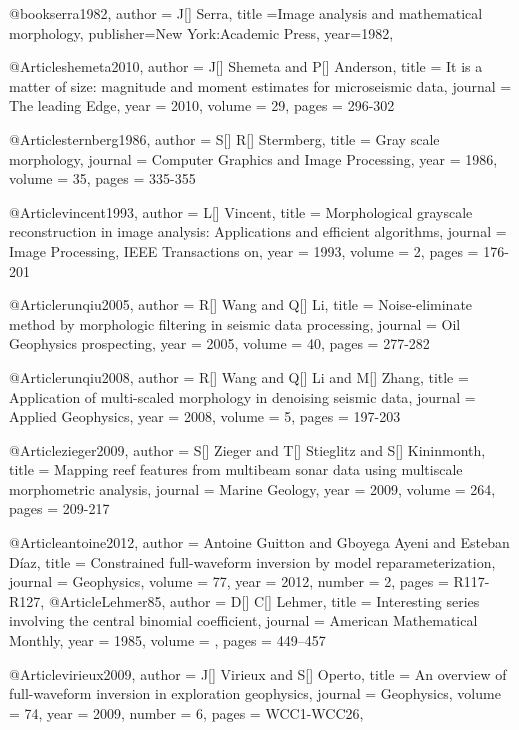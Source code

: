   
@book{serra1982,
  author = {J[] Serra},
  title ={Image analysis and mathematical morphology},
  publisher={New York:Academic Press},
  year=1982,
}

       @Article{shemeta2010,
  author = 	 {J[] Shemeta and P[] Anderson},
  title = 	 {It is a matter of size: magnitude and moment estimates for microseismic data},
  journal = 	 {The leading Edge},
  year = 	 2010,
  volume = 	 29,
  pages = 	 {296-302}} 
  
         @Article{sternberg1986,
  author = 	 {S[] R[] Stermberg},
  title = 	 {Gray scale morphology},
  journal = 	 {Computer Graphics and Image Processing},
  year = 	 1986,
  volume = 	 35,
  pages = 	 {335-355}}  
  
          @Article{vincent1993,
  author = 	 {L[] Vincent},
  title = 	 {Morphological grayscale reconstruction in image analysis: Applications and efficient algorithms},
  journal = 	 {Image Processing, IEEE Transactions on},
  year = 	 1993,
  volume = 	 2,
  pages = 	 {176-201}}  
  
          @Article{runqiu2005,
  author = 	 {R[] Wang and Q[] Li},
  title = 	 {Noise-eliminate method by morphologic filtering in seismic data processing},
  journal = 	 {Oil Geophysics prospecting},
  year = 	 2005,
  volume = 	 40,
  pages = 	 {277-282}}  
  
  
            @Article{runqiu2008,
  author = 	 {R[] Wang and Q[] Li and M[] Zhang},
  title = 	 {Application of multi-scaled morphology in denoising seismic data},
  journal = 	 {Applied Geophysics},
  year = 	 2008,
  volume = 	 5,
  pages = 	 {197-203}}    
 
             @Article{zieger2009,
  author = 	 {S[] Zieger and T[] Stieglitz and S[] Kininmonth},
  title = 	 {Mapping reef features from multibeam sonar data using multiscale morphometric analysis},
  journal = 	 {Marine Geology},
  year = 	 2009,
  volume = 	 264,
  pages = 	 {209-217}}   
  
@Article{antoine2012,
  author =	 { Antoine Guitton and Gboyega Ayeni and Esteban Díaz},
  title =	 {Constrained full-waveform inversion by model reparameterization},
  journal =	 {Geophysics},
  volume =	 77,
  year =	 2012,
  number =	 2,
  pages =	 {R117-R127},
}
@Article{Lehmer85,
  author = 	 {D[] C[] Lehmer},
  title = 	 {Interesting series involving the central binomial coefficient},
  journal = 	 {American Mathematical Monthly},
  year = 	 1985,
  volume =	 ,
  pages =	 {449–457}
}

@Article{virieux2009,
  author =	 { J[] Virieux and S[] Operto},
  title =	 {An overview of full-waveform inversion in exploration geophysics},
  journal =	 {Geophysics},
  volume =	 74,
  year =	 2009,
  number =	 6,
  pages =	 {WCC1-WCC26},
}

